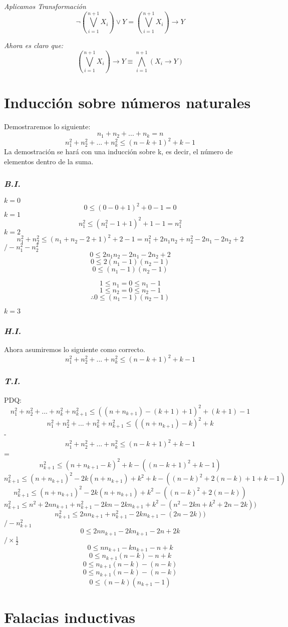 \documentclass{article}
\begin{document}
\emph{Aplicamos Transformación}
\[ \neg(\bigvee _{i=1}^{n+1} X_i) \lor Y = (\bigvee _{i=1}^{n+1} X_i) \rightarrow Y\]

\emph{Ahora es claro que:}
\[ (\bigvee _{i=1}^{n+1} X_i) \rightarrow Y \equiv \bigwedge _{i=1}^{n+1} (X_i \rightarrow Y) \]

\newpage
\section{Inducción sobre números naturales}
Demostraremos lo siguiente:
\[ n_1 + n_2 + ... + n_k = n \]
\[ n_1^2 + n_2^2 + ... + n_k^2 \leq (n-k+1)^2 + k -1\]
La demostración se hará con una inducción sobre k, es decir, el número de 
elementos dentro de la suma.

\subsubsection*{\emph{B.I.}}
$k=0$
\[0 \leq (0 - 0 +1)^2 + 0 -1 = 0\]
$k=1$
\[ n_1^2 \leq (n_1^2 - 1 + 1)^2 + 1 - 1 = n_1^2\]
$k=2$
\[ n_1^2 + n_2^2 \leq (n_1 + n_2 - 2 + 1)^2 + 2 -1 = n_1^2 + 2n_1n_2+n_2^2-2n_1-2n_2+2 \]
\hspace*{0pt}\hfill $/ - n_1^2 - n_2^2$
\[ 0 \leq  2n_1n_2-2n_1-2n_2+2 \]
\[ 0 \leq 2(n_1 - 1)(n_2 - 1) \]
\[ 0 \leq (n_1 - 1)(n_2 -1) \]

\[ 1 \leq n_1 = 0 \leq n_1 - 1  \]
\[ 1 \leq n_2 = 0 \leq n_2 -1  \]
\[ \therefore  0 \leq (n_1 - 1)(n_2 -1)\]

$k=3$
\subsubsection*{\emph{H.I.}}
Ahora asumiremos lo siguiente como correcto.
\[ n_1^2 + n_2^2 + ... + n_k^2 \leq (n-k+1)^2 + k -1\]


\subsubsection*{\emph{T.I.}}
PDQ:
\[ n_1^2 + n_2^2 + ... + n_k^2 + n_{k+1}^2 \leq ((n + n_{k+1}) - (k+1) + 1)^2 + (k+1)-1 \]
\[ n_1^2 + n_2^2 + ... + n_k^2 + n_{k+1}^2 \leq ((n + n_{k+1}) - k)^2 + k \]
-\[   n_1^2 + n_2^2 + ... + n_k^2 \leq (n-k+1)^2 + k -1\]
=\[ n_{k+1}^2 \leq (n+n_{k+1} - k)^2 + k - ((n-k+1)^2 + k -1) \]
\[ n_{k+1}^2 \leq (n+n_{k+1})^2 - 2k(n+n_{k+1}) + k^2 + k - ((n-k)^2 + 2(n-k) + 1+ k -1) \]
\[ n_{k+1}^2 \leq (n+n_{k+1})^2 - 2k(n+n_{k+1}) + k^2 - ((n-k)^2 + 2(n-k)) \]
\[ n_{k+1}^2 \leq n^2 + 2nn_{k+1} + n_{k+1}^2 - 2kn -2kn_{k+1} + k^2  - (n^2 - 2kn +k^2 + 2n - 2k)) \]
\[ n_{k+1}^2 \leq 2nn_{k+1} + n_{k+1}^2 -2kn_{k+1} - ( 2n - 2k)) \]
\hspace*{0pt}\hfill $/ -n_{k+1}^2 $
\[ 0 \leq 2nn_{k+1} -2kn_{k+1} - 2n + 2k \]
\hspace*{0pt}\hfill $/ \times\frac{1}{2} $
\[ 0 \leq nn_{k+1} -kn_{k+1} - n + k \]
\[ 0 \leq n_{k+1}(n-k) - n + k \]
\[ 0 \leq n_{k+1}(n-k) - (n - k) \]
\[ 0 \leq n_{k+1}(n-k) - (n - k) \]
\[ 0 \leq (n-k)( n_{k+1}-1) \]


\section{Falacias inductivas}
\end{document}
